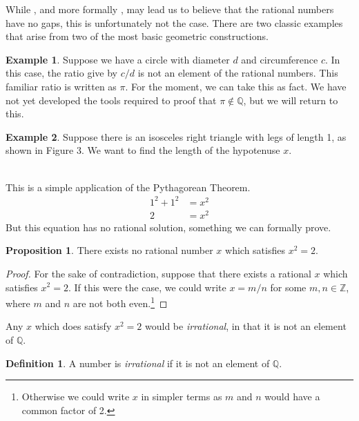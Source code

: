\documentclass{article}
\newcommand{\Q}{\mathbb{Q}}
\newcommand{\Z}{\mathbb{Z}}
\theoremstyle{definition}
\newtheorem{proposition}{Proposition}[section]
\newtheorem{definition}{Definition}[section]
\newtheorem{example}{Example}[section]
\begin{document}
	While , and more formally , may lead us to believe that the rational numbers have no gaps, this is unfortunately not the case. There are two classic examples that arise from two of the most basic geometric constructions. 
	\begin{example}
		Suppose we have a circle with diameter $ d $ and circumference $ c $. In this case, the ratio give by $ c/d $ is not an element of the rational numbers. This familiar ratio is written as $ \pi $. For the moment, we can take this as fact. We have not yet developed the tools required to proof that $ \pi\notin\Q $, but we will return to this.  
	\end{example}
	\begin{example}
		Suppose there is an isosceles right triangle with legs of length 1, as shown in Figure 3. We want to find the length of the hypotenuse $ x $. 
		\begin{figure}[h]
			\centering
			\caption{}
		\end{figure}\\
		This is a simple application of the Pythagorean Theorem. \begin{align*}
			1^2+1^2&=x^2\\2&=x^2
		\end{align*}
		But this equation has no rational solution, something we can formally prove. 
	\end{example}
	\begin{proposition}
		There exists no rational number $ x $ which satisfies $ x^2=2 $. 
	\end{proposition}
	\begin{proof}
		For the sake of contradiction, suppose that there exists a rational $ x $ which satisfies $ x^2=2 $. If this were the case, we could write $ x=m/n $ for some $ m,n\in\Z $, where $ m $ and $ n $ are not both even.\footnote{Otherwise we could write $ x $ in simpler terms as $ m $ and $ n $ would have a common factor of 2.}
	\end{proof}
	Any $ x $ which does satisfy $ x^2=2 $ would be \textit{irrational}, in that it is not an element of $ \Q $. 
	\begin{definition}\label{def1.4}
		A number is {\color{red}\textit{irrational}} if it is not an element of $ \Q $. 
	\end{definition}
\end{document}
